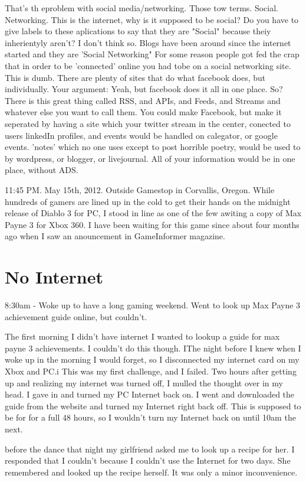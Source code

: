 \documentclass[12pt,letterpaper]{article}
\begin{document}
That's th eproblem with social media/networking. Those tow terms.
Social. Networking. This is the internet, why is it supposed to be
social? Do you have to give labels to these aplications to say that they
are "Social" because theiy inherientyly aren't? I don't think so. Blogs
have been around since the internet started and they are 'Social
Networking" For some reason people got fed the crap that in order to be
'connected' online you had tobe on a social networking site. This is
dumb. There are plenty of sites that do what facebook does, but
individually. Your argument: Yeah, but facebook does it all in one
place. So? There is this great thing called RSS, and APIs, and Feeds,
and Streams and whatever else you want to call them. You could make
Facebook, but make it seperated by having a site which your twitter
stream in the center, conected to users linkedIn profiles, and events
would be handled on calegator, or google events. 'notes' which no one
uses except to post horrible poetry, would be used to by wordpress, or
blogger, or livejournal.  All of your information would be in one place,
without ADS.


11:45 PM. May 15th, 2012. Outside Gamestop in Corvallis, Oregon. While hundreds of gamers are lined up
in the cold to get their hands on the midnight release of Diablo 3 for
PC, I stood in line as one of the few awiting a copy of Max Payne 3 for
Xbox 360. I have been waiting for this game since about four months ago
when I saw an anouncement in GameInformer magazine. 


\section{No Internet}
8:30am - Woke up to have a long gaming weekend. Went to look up Max
Payne 3 achievement guide online, but couldn't.

The first morning I didn't have internet I wanted to lookup a guide for
max payne 3 achievements. I couldn't do this though. IThe night before I
knew when I woke up in the morning I would forget, so I disconnected my
internet card on my Xbox and PC.i This was my first challenge, and I
failed. Two hours after getting up and realizing my internet was turned
off, I mulled the thought over in my head.  I gave in and turned my PC
Internet back on. I went and downloaded the guide from the website and
turned my Internet right back off. This is supposed to be for for a full
48 hours, so I wouldn't turn my Internet back on until 10am the next.


before the dance that night my girlfriend asked me to look up a recipe
for her. I responded that I couldn't because I couldn't use the Internet
for two days. She remembered and looked up the recipe herself. It was
only a minor inconvenience.
\end{document}
